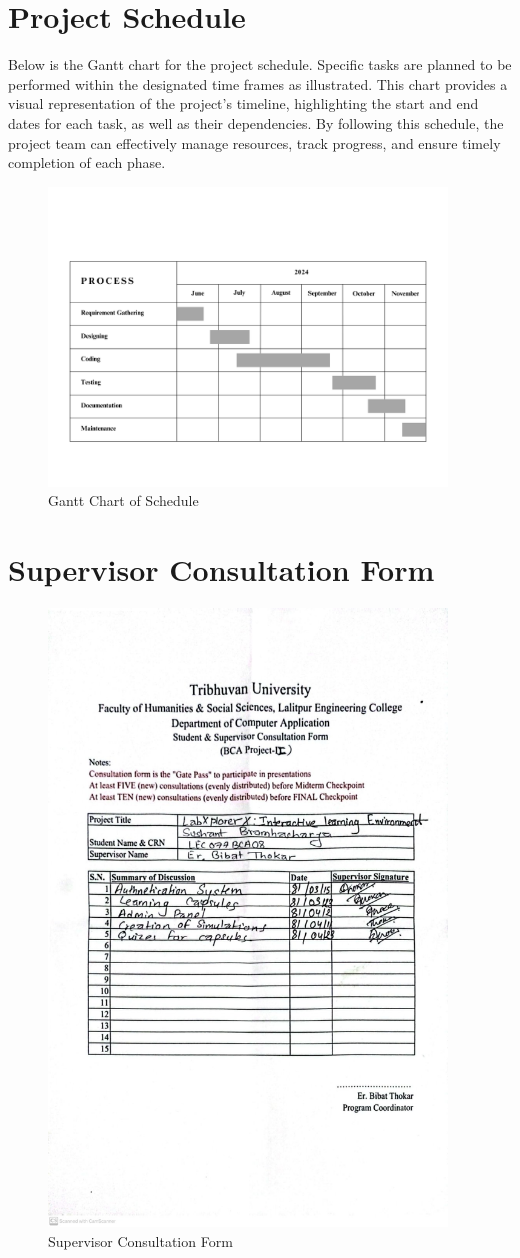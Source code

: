 \section{Project Schedule}
Below is the Gantt chart for the project schedule. Specific tasks are planned to be performed within the designated time frames as illustrated. This chart provides a visual representation of the project's timeline, highlighting the start and end dates for each task, as well as their dependencies. By following this schedule, the project team can effectively manage resources, track progress, and ensure timely completion of each phase.
\begin{figure}[H]
    \centering
        \includegraphics[width=400px]{Diagrams/Gantt_Chart.png}
    \caption{Gantt Chart of Schedule}
\end{figure}
\section{Supervisor Consultation Form}
\begin{figure}[H]
    \centering
        \includegraphics[width=400px]{Diagrams/supervisor.jpg}
    \caption{Supervisor Consultation Form}
\end{figure}